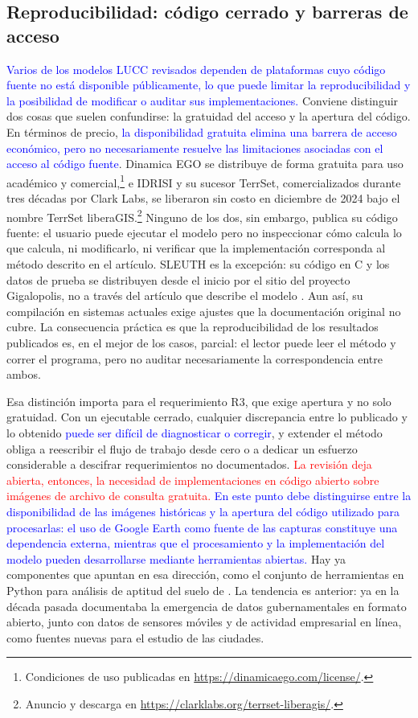 \subsection{Reproducibilidad: código cerrado y barreras de acceso}

\textcolor{blue}{Varios de los modelos LUCC revisados dependen de plataformas
cuyo código fuente no está disponible públicamente, lo que puede limitar la
reproducibilidad y la posibilidad de modificar o auditar sus implementaciones.}
Conviene distinguir dos cosas que suelen confundirse: la gratuidad del acceso y
la apertura del código. En términos de precio, \textcolor{blue}{la
disponibilidad gratuita elimina una barrera de acceso económico, pero no
necesariamente resuelve las limitaciones asociadas con el acceso al código
fuente}. Dinamica EGO se distribuye de forma gratuita para uso académico y
comercial,\footnote{Condiciones de uso publicadas en
\url{https://dinamicaego.com/license/}.}
e IDRISI y su sucesor TerrSet, comercializados durante tres décadas por Clark
Labs, se liberaron sin costo en diciembre de 2024 bajo el nombre TerrSet
liberaGIS.\footnote{Anuncio y descarga en
\url{https://clarklabs.org/terrset-liberagis/}.}
Ninguno de los dos, sin embargo, publica su código fuente: el usuario puede
ejecutar el modelo pero no inspeccionar cómo calcula lo que calcula, ni
modificarlo, ni verificar que la implementación corresponda al método descrito
en el artículo. SLEUTH es la excepción: su código en C y los datos de prueba se
distribuyen desde el inicio por el sitio del proyecto Gigalopolis, no a través
del artículo que describe el modelo \parencite{Clarke2008}. Aun así, su
compilación en sistemas actuales exige ajustes que la documentación original
no cubre. La consecuencia práctica es que la reproducibilidad de los
resultados publicados es, en el mejor de los casos, parcial: el lector puede
leer el método y correr el programa, pero no auditar necesariamente la
correspondencia entre ambos.

Esa distinción importa para el requerimiento R3, que exige apertura y no solo
gratuidad. Con un ejecutable cerrado, cualquier discrepancia entre lo publicado
y lo obtenido \textcolor{blue}{puede ser difícil de diagnosticar o corregir},
y extender el método obliga a reescribir el flujo de trabajo desde cero o a
dedicar un esfuerzo considerable a descifrar requerimientos no documentados.
\textcolor{red}{La revisión deja abierta, entonces, la necesidad de
implementaciones en código abierto sobre imágenes de archivo de consulta
gratuita.} \textcolor{blue}{En este punto debe distinguirse entre
la disponibilidad de las imágenes históricas y la apertura del código utilizado
para procesarlas: el uso de Google Earth como fuente de las capturas constituye
una dependencia externa, mientras que el procesamiento y la implementación del
modelo pueden desarrollarse mediante herramientas abiertas.} Hay ya
componentes que apuntan en esa dirección, como el conjunto de herramientas en
Python para análisis de aptitud del suelo de \textcite{Chen2022}. La tendencia
es anterior: ya en la década pasada \textcite{ArribasBel2014} documentaba la
emergencia de datos gubernamentales en formato abierto, junto con datos de
sensores móviles y de actividad empresarial en línea, como fuentes nuevas para
el estudio de las ciudades.

